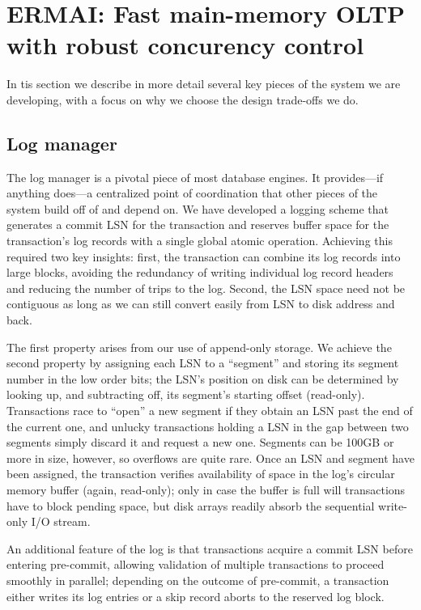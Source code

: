 
\section{ERMAI: Fast main-memory OLTP with robust concurency control}

In tis section we describe in more detail several key pieces of the system we are developing, with a focus on why we choose the design trade-offs we do.

\subsection{Log manager}

The log manager is a pivotal piece of most database engines. It provides---if anything does---a centralized point of coordination that other pieces of the system build off of and depend on. We have developed a logging scheme that  generates a commit LSN for the transaction and reserves buffer space for the transaction's log records with a single global atomic operation. Achieving this required two key insights: first, the transaction can combine its log records into large blocks, avoiding the redundancy of writing individual log record headers and reducing the number of trips to the log. Second, the LSN space need not be contiguous as long as we can still convert easily from LSN to disk address and back.

The first property arises from our use of append-only storage. We achieve the second property by assigning each LSN to a ``segment'' and storing its segment number in the low order bits; the LSN's position on disk can be determined by looking up, and subtracting off, its segment's starting offset (read-only). Transactions race to ``open'' a new segment if they obtain an LSN past the end of the current one, and unlucky transactions holding a LSN in the gap between two segments simply discard it and request a new one. Segments can be 100GB or more in size, however, so overflows are quite rare. Once an LSN and segment have been assigned, the transaction verifies availability of space in the log's circular memory buffer (again, read-only); only in case the buffer is full will transactions have to block pending space, but disk arrays readily absorb the sequential write-only I/O stream.

An additional feature of the log is that transactions acquire a commit LSN before entering pre-commit, allowing validation of multiple transactions to proceed smoothly in parallel; depending on the outcome of pre-commit, a transaction either writes its log entries or a skip record aborts to the reserved log block.

